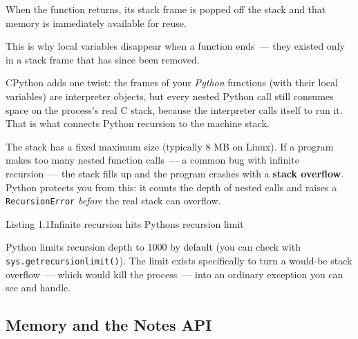\noindent{}When the function returns, its stack frame is popped off the stack and that memory is immediately available for reuse.

This is why local variables disappear when a function ends~--- they existed only in a stack frame that has since been removed.

CPython adds one twist: the frames of your \emph{Python} functions (with their local variables) are interpreter objects, but every nested Python call still consumes space on the process's real C stack, because the interpreter calls itself to run it. That is what connects Python recursion to the machine stack.

The stack has a fixed maximum size (typically 8 MB on Linux). If a program makes too many nested function calls~--- a common bug with infinite recursion~--- the stack fills up and the program crashes with a \textbf{stack overflow}. Python protects you from this: it counts the depth of nested calls and raises a \texttt{RecursionError} \emph{before} the real stack can overflow.

\begin{codeboxcap}[short]{\textcolor{accent}{Listing 1.1}\enspace Infinite recursion hits Python\textquotesingle s recursion limit}

\begin{Shaded}
\begin{Highlighting}[]
\OperatorTok{{-}} \NormalTok{)  }

\NormalTok{)}
\end{Highlighting}
\end{Shaded}

\end{codeboxcap}

\noindent{}Python limits recursion depth to 1000 by default (you can check with \texttt{sys.getrecursionlimit()}). The limit exists specifically to turn a would-be stack overflow~--- which would kill the process~--- into an ordinary exception you can see and handle.

\subsection*{Memory and the Notes API}\label{01-command-to-process:memory-and-the-notes-api}

